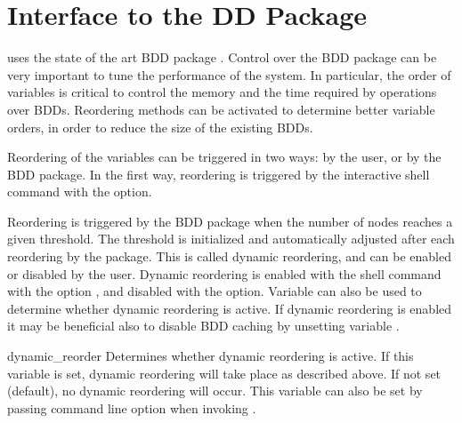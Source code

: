 \section{Interface to the DD Package}
\label{Interface to DD package}
\label{DD package interface}

\nusmv uses the state of the art BDD package \cudd \cite{Som98}.
Control over the BDD package can be very important to tune the
performance of the system. In particular, the order of variables is
critical to control the memory and the time required by operations
over BDDs.  Reordering methods can be activated to determine better
variable orders, in order to reduce the size of the existing BDDs.

Reordering of the variables can be triggered in two ways: by the user,
or by the BDD package.  In the first way, reordering is triggered by
the interactive shell command  with the
 option.

Reordering is triggered by the BDD package when the number of nodes
reaches a given threshold. The threshold is initialized and
automatically adjusted after each reordering by the package.  This is
called dynamic reordering, and can be enabled or disabled by the
user.  Dynamic reordering is enabled with the shell command
 with the option , and disabled
with the  option. Variable  can also be used
to determine whether dynamic reordering is active.
%
If dynamic reordering is enabled it may be beneficial also to disable
BDD caching by unsetting variable .

\begin{nusmvVar} {dynamic\_reorder}{}{}
Determines whether dynamic reordering is active. If this variable is
set, dynamic reordering will take place as described above. If not set
(default), no dynamic reordering will occur. This variable can also be
set by passing  command line option when invoking
\nusmv.
\end{nusmvVar}


